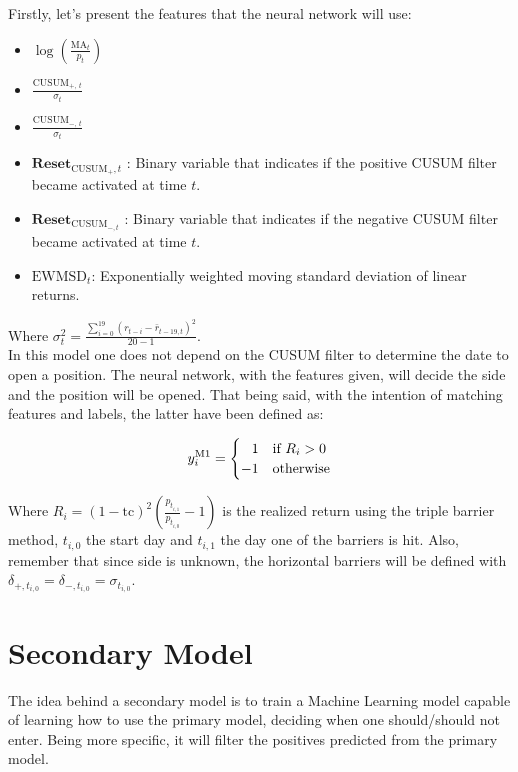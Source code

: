 \documentclass[a4paper]{report}
\begin{document}
Firstly, let's present the features that the neural network will use:
\begin{itemize}
	\item $\log \left( \frac{\text{MA}_t}{p_t} 
	\right)$
	
	\item $\frac{\text{CUSUM}_{+,\ t}}{\sigma_t}$
	
	\item $\frac{\text{CUSUM}_{-,\ t}}{\sigma_t}$
	
	\item $\textbf{Reset}_{\text{CUSUM}_{+},t}$ : Binary variable that 
	indicates if the positive CUSUM filter became activated at time $t$.
	
	\item $\textbf{Reset}_{\text{CUSUM}_{-,t}}$ : Binary variable that 
	indicates if the negative CUSUM filter became activated at time $t$.
	
	\item $\text{EWMSD}_t$: Exponentially weighted moving standard deviation 
	of linear returns.
\end{itemize}

Where $\sigma_t^2 = \frac{\sum_{i=0}^{19}(r_{t-i} - 
\bar{r}_{t-19, t})^2}{20 - 1}$.\\

In this model one does not depend on the CUSUM filter to determine the 
date to open a position. The neural network, with the  features given, 
will decide the side and the position will be opened. That being said, 
with the intention of matching features and labels, the latter have 
been defined as:

\begin{equation}
	y_{i}^{\text{M1}} = 
	\begin{cases}
	\hfill 1 & \text{if}\ R_i > 0\\
	\hfill -1 & \text{otherwise}	
	\end{cases}
\end{equation}

Where $R_i = (1 - \text{tc})^2 \left( \frac{p_{t_{i,1}}}{p_{t_{i,0}}} -1 
\right) $ is the realized return using the triple barrier method, $t_{i,0}$ 
the start day and $t_{i,1}$ the day one of the barriers is hit. Also, 
remember that since side is unknown, the horizontal barriers will be defined 
with $\delta_{+, t_{i,0}} = \delta_{-, t_{i,0}} = \sigma_{t_{i,0}}$.

\section{Secondary Model}
\label{sec:secondaryModel}
The idea behind a secondary model is to train a Machine Learning model 
capable of learning how to use the primary model, deciding when one 
should/should not enter. Being more specific, it will filter the positives 
predicted from the primary model.\\
\end{document}
